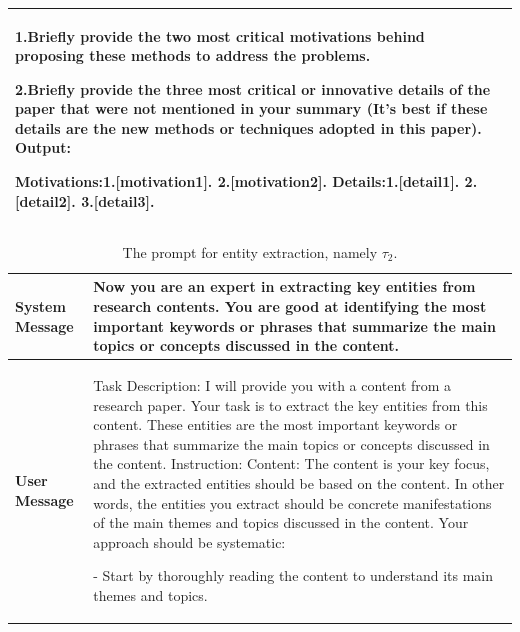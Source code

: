 \documentclass{article}
\theoremstyle{plain}
\theoremstyle{definition}
\theoremstyle{remark}
\begin{document}
\begin{table}[t]
{\begin{tabular}{m{} | m{}}
1.Briefly provide the two most critical motivations behind proposing these methods to address the problems. 

2.Briefly provide the three most critical or innovative details of the paper that were not mentioned in your summary (It's best if these details are the new methods or techniques adopted in this paper).
\newline\linebreak
Output:

Motivations:1.[motivation1]. 2.[motivation2]. Details:1.[detail1]. 2.[detail2]. 3.[detail3]. \\
		\bottomrule
	\end{tabular}
    }
\end{table}



\begin{table}[t]
	\centering  %
	\caption{The prompt for entity extraction, namely $\tau_2$.}  %
	\label{tab:ee}  %
	\begin{tabular}{l | m{}}  
		\toprule  %
            \textbf{System Message} & Now you are an expert in extracting key entities from research contents. You are good at identifying the most important keywords or phrases that summarize the main topics or concepts discussed in the content. \\
            \midrule
            \textbf{User Message} & Task Description:
\newline\linebreak
I will provide you with a content from a research paper. Your task is to extract the key entities from this content. These entities are the most important keywords or phrases that summarize the main topics or concepts discussed in the content.
\newline\linebreak
Instruction:
\newline\linebreak
Content: The content is your key focus, and the extracted entities should be based on the content. In other words, the entities you extract should be concrete manifestations of the main themes and topics discussed in the content.
\newline\linebreak
Your approach should be systematic:

- Start by thoroughly reading the content to understand its main themes and topics.


\end{tabular}
\end{table}
\end{document}
